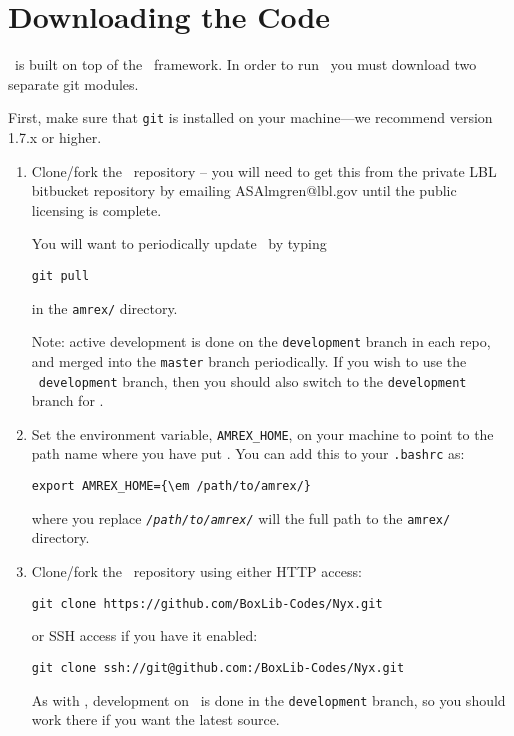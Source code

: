 
\section{Downloading the Code}

\nyx\ is built on top of the \amrex\ framework.  In order to run
\nyx\, you must download two separate git modules.

\vspace{.1in}

\noindent First, make sure that {\tt git} is installed on your machine---we recommend version 1.7.x or higher.

\vspace{.1in}

\begin{enumerate}

\item Clone/fork the \amrex\ repository -- you will need to 
get this from the private LBL bitbucket repository by emailing
ASAlmgren@lbl.gov until the public licensing is complete.

You will want to periodically update \amrex\ by typing
\begin{verbatim}
git pull
\end{verbatim}
in the {\tt amrex/} directory.

Note: active development is done on the {\tt development} branch
in each repo, and merged into the {\tt master} branch periodically.
If you wish to use the \nyx\ {\tt development} branch, then you
should also switch to the {\tt development} branch for \amrex.

\item Set the environment variable, {\tt AMREX\_HOME}, on your
  machine to point to the path name where you have put \amrex.
  You can add this to your {\tt .bashrc} as:
\begin{Verbatim}[commandchars=\\\{\}]
export AMREX_HOME={\em /path/to/amrex/}
\end{Verbatim}
where you replace \texttt{\em /path/to/amrex/} will the full path to the
{\tt amrex/} directory.

\item Clone/fork the \nyx\ repository using either HTTP access:
\begin{verbatim}
git clone https://github.com/BoxLib-Codes/Nyx.git
\end{verbatim}
or SSH access if you have it enabled:
\begin{verbatim}
git clone ssh://git@github.com:/BoxLib-Codes/Nyx.git
\end{verbatim}

As with \amrex, development on \nyx\ is done in the
{\tt development} branch, so you should work there if you want
the latest source.

\end{enumerate}

